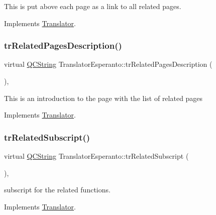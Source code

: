 This is put above each page as a link to all related pages. 

Implements \mbox{\hyperlink{class_translator}{Translator}}.

\mbox{\label{class_translator_esperanto_a816c2a3ff7df0820200c845eaddf9f78}} 
\subsubsection{\texorpdfstring{trRelatedPagesDescription()}{trRelatedPagesDescription()}}
{\footnotesize\ttfamily virtual \mbox{\hyperlink{class_q_c_string}{Q\+C\+String}} Translator\+Esperanto\+::tr\+Related\+Pages\+Description (\begin{DoxyParamCaption}{ }\end{DoxyParamCaption})\hspace{0.3cm}{\ttfamily [inline]}, {\ttfamily [virtual]}}

This is an introduction to the page with the list of related pages 

Implements \mbox{\hyperlink{class_translator}{Translator}}.

\mbox{\label{class_translator_esperanto_a44140994ab557e4aaa96b8a55d13c124}} 
\subsubsection{\texorpdfstring{trRelatedSubscript()}{trRelatedSubscript()}}
{\footnotesize\ttfamily virtual \mbox{\hyperlink{class_q_c_string}{Q\+C\+String}} Translator\+Esperanto\+::tr\+Related\+Subscript (\begin{DoxyParamCaption}{ }\end{DoxyParamCaption})\hspace{0.3cm}{\ttfamily [inline]}, {\ttfamily [virtual]}}

subscript for the related functions. 

Implements \mbox{\hyperlink{class_translator}{Translator}}.

\mbox{\label{class_translator_esperanto_abcd7cef459fb821b61d635108bf482b0}} 
